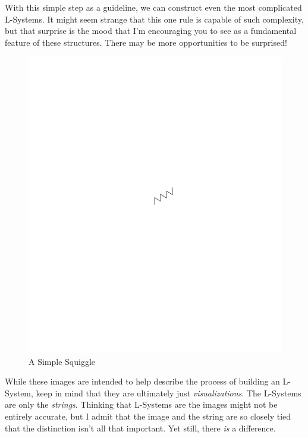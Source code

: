 \documentclass[12pt,twoside]{reedthesis}
\begin{document}
	 With this simple step as a guideline, we can construct even the most complicated L-Systems. It might seem strange that this one rule is capable of such complexity, but that surprise is the mood that I'm encouraging you to see as a fundamental feature of these structures. There may be more opportunities to be surprised!

	\begin{figure}[h!]
	\centering
	\includegraphics[clip=true, viewport=4in 5.8in 7in 6.5in, scale=1]{Images/UnderstandingThroughDefinitions2}
	\caption[A Simple Squiggle]{A Simple Squiggle\footnotemark}
	\label {UnderstandingThroughDefinitions1}
	\end{figure}
	
	While these images are intended to help describe the process of building an L-System, keep in mind that they are ultimately just \textit{visualizations}. The L-Systems are only the \textit{strings}. Thinking that L-Systems are the images might not be entirely accurate, but I admit that the image and the string are so closely tied that the distinction isn't all that important. Yet still, there \textit{is} a difference.
\end{document}
